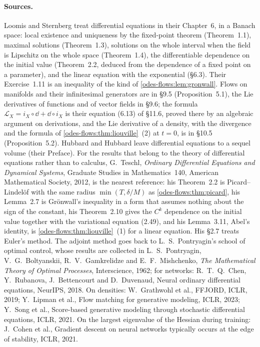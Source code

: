 \begin{notechapter}
\paragraph{Sources.} Loomis and Sternberg treat differential equations
in their Chapter~6, in a Banach space: local existence and uniqueness
by the fixed-point theorem (Theorem~1.1), maximal solutions
(Theorem~1.3), solutions on the whole interval when the field is
Lipschitz on the whole space (Theorem~1.4), the differentiable
dependence on the initial value (Theorem~2.2, deduced from the
dependence of a fixed point on a parameter), and the linear equation
with the exponential (\S6.3). Their Exercise~1.11 is an inequality of
the kind of \cref{odes-flows:lem:gronwall}. Flows on manifolds and
their infinitesimal generators are in \S9.5 (Proposition~5.1), the
Lie derivatives of functions and of vector fields in \S9.6; the
formula $\mathcal L_X = i_X\circ\dd + \dd\circ i_X$ is their equation
(6.13) of \S11.6, proved there by an algebraic argument on
derivations, and the Lie derivative of a density, with the divergence
and the formula of \cref{odes-flows:thm:liouville}~(2) at $t = 0$, is
in \S10.5 (Proposition~5.2).
Hubbard and Hubbard leave differential equations to a sequel volume
(their Preface). For the results that belong to the theory of
differential equations rather than to calculus, G.~Teschl,
\emph{Ordinary Differential Equations and Dynamical Systems}, Graduate
Studies in Mathematics~140, American Mathematical Society, 2012, is the
nearest reference: his Theorem~2.2 is Picard--Lindel\"of with the same
radius $\min(T, \delta/M)$ as \cref{odes-flows:thm:picard}, his
Lemma~2.7 is Gr\"onwall's inequality in a form that assumes nothing
about the sign of the constant, his Theorem~2.10 gives the $C^k$
dependence on the initial value together with the variational equation
(2.49), and his Lemma~3.11, Abel's identity, is
\cref{odes-flows:thm:liouville}~(1) for a linear equation. His \S2.7
treats Euler's method. The adjoint method goes back to L.~S.~Pontryagin's
school of optimal control, whose results are collected in
L.~S.~Pontryagin, V.~G.~Boltyanskii, R.~V.~Gamkrelidze and
E.~F.~Mishchenko, \emph{The Mathematical Theory of Optimal Processes},
Interscience, 1962; for networks: R.~T.~Q.~Chen, Y.~Rubanova,
J.~Bettencourt and D.~Duvenaud, Neural ordinary differential
equations, NeurIPS, 2018.
On densities: W.~Grathwohl et al., FFJORD, ICLR, 2019; Y.~Lipman et
al., Flow matching for generative modeling, ICLR, 2023; Y.~Song et
al., Score-based generative modeling through stochastic differential
equations, ICLR, 2021. On the largest eigenvalue of the Hessian during
training: J.~Cohen et al., Gradient descent on neural networks
typically occurs at the edge of stability, ICLR, 2021.


\end{notechapter}
